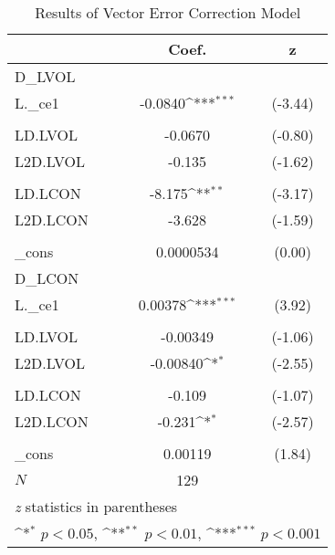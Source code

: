 \begin{table}
\begin{center}
\caption[VECM Results]{Results of Vector Error Correction Model \label{vec}}
\vspace{0.3in}
{
\def\sym#1{\ifmmode^{#1}\else\(^{#1}\)\fi}
\begin{tabular}{l*{1}{cc}}
\hline\hline
&       Coef.           & z         \\
\hline
D\_LVOL    &                  &       \\
L.\_ce1    &  -0.0840\sym{***}&  (-3.44)\\
& & \\
LD.LVOL   &  -0.0670         &  (-0.80)\\
L2D.LVOL  &   -0.135         &  (-1.62)\\
& & \\
LD.LCON   &   -8.175\sym{**} &  (-3.17)\\
L2D.LCON  &   -3.628         &  (-1.59)\\
& & \\
\_cons    &0.0000534         &   (0.00)\\
\hline
D\_LCON    &                  &         \\
L.\_ce1    &  0.00378\sym{***}&   (3.92)\\
& & \\
LD.LVOL   & -0.00349         &  (-1.06)\\
L2D.LVOL  & -0.00840\sym{*}  &  (-2.55)\\
& & \\
LD.LCON   &   -0.109         &  (-1.07)\\
L2D.LCON  &   -0.231\sym{*}  &  (-2.57)\\
& & \\
\_cons    &  0.00119         &   (1.84)\\
\hline
\(N\)     &      129         &         \\
\hline\hline
\multicolumn{3}{l}{\footnotesize \textit{z} statistics in parentheses}\\
\multicolumn{3}{l}{\footnotesize \sym{*} \(p<0.05\), \sym{**} \(p<0.01\), \sym{***} \(p<0.001\)}\\
\end{tabular}
}
\end{center}
\end{table}

